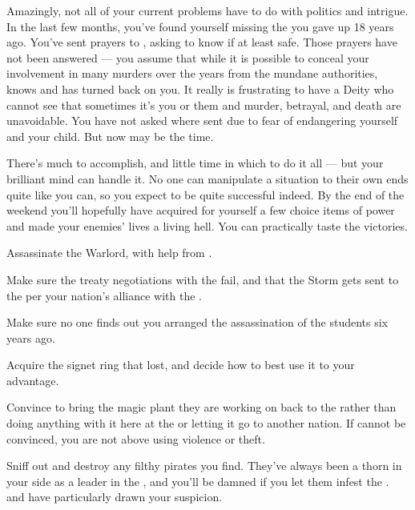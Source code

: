 \documentclass[char]{GL2020}
\begin{document}
Amazingly, not all of your current problems have to do with politics and intrigue. In the last few months, you've found yourself missing the \cPirateChild{\child} you gave up 18 years ago. You've sent prayers to \cFarmGod{}, asking to know if \cPirateChild{\they} \cPirateChild{\are} at least safe. Those prayers have not been answered — you assume that while it is possible to conceal your involvement in many murders over the years from the mundane authorities, \cFarmGod{} knows and has turned \cFarmGod{\their} back on you. It really is frustrating to have a Deity who cannot see that sometimes it's you or them and murder, betrayal, and death are unavoidable. You have not asked \cEthics{} where \cEthics{\they} sent \PirateChild{\them} due to fear of endangering yourself and your child.  But now may be the time.  

There's much to accomplish, and little time in which to do it all — but your brilliant mind can handle it. No one can manipulate a situation to their own ends quite like you can, so you expect to be quite successful indeed. By the end of the weekend you'll hopefully have acquired for yourself a few choice items of power and made your enemies’ lives a living hell. You can practically taste the victories.

\begin{itemz}
    \item Assassinate the \pShippies{} Warlord, \cLoud{\full} with help from \cDiplomat{}.
    \item Make sure the treaty negotiations with the \pShip{} fail, and that the Storm gets sent to the \pShip{} per your nation's alliance with the \pTech{}.
    \item Make sure no one finds out you arranged the assassination of the students six years ago.
    \item Acquire the \pFarm{} signet ring that \cPrince{} lost, and decide how to best use it to your advantage.
    \item Convince  \cCurse{} to bring the magic plant they are working on back to the \pFarm{} rather than doing anything with it here at the \pSchool{} or letting it go to another nation. If \cCurse{} cannot be convinced, you are not above using violence or theft.    \item Sniff out and destroy any filthy pirates you find. They've always been a thorn in your side as a leader in the \pFarm{}, and you'll be damned if you let them infest the \pSc{}. \cPirateChild{} and \cJuniorStatesman{} have particularly drawn your suspicion.
\end{itemz}
\end{document}
